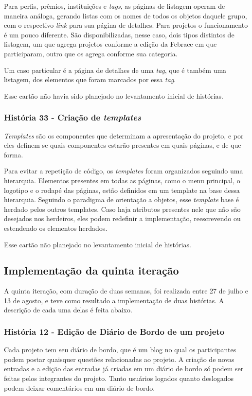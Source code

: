       Para perfis, prêmios, instituições e \textit{tags}, as páginas de listagem operam de maneira análoga, gerando listas com os nomes de todos os objetos daquele grupo, com o respectivo \textit{link} para sua página de detalhes. Para projetos o funcionamento é um pouco diferente. São disponibilizadas, nesse caso, dois tipos distintos de listagem, um que agrega projetos conforme a edição da Febrace em que participaram, outro que os agrega conforme sua categoria.

      Um caso particular é a página de detalhes de uma \textit{tag}, que é também uma listagem, dos elementos que foram marcados por essa \textit{tag}.

  Esse cartão não havia sido planejado no levantamento inicial de histórias.

    \subsubsection{História 33 - Criação de \textit{templates}}
      \textit{Templates} são os componentes que determinam a apresentação do projeto, e por eles definem-se quais componentes estarão presentes em quais páginas, e de que forma.

      Para evitar a repetição de código, os \textit{templates} foram organizados seguindo uma hierarquia. Elementos presentes em todas as páginas, como o menu principal, o logotipo e o rodapé das páginas, estão definidos em um template na base dessa hierarquia. Seguindo o paradigma de orientação a objetos, esse \textit{template} base é herdado pelos outros templates. Caso haja atributos presentes nele que não são desejados nos herdeiros, eles podem redefinir a implementação, reescrevendo ou estendendo os elementos herdados.

  Esse cartão não planejado no levantamento inicial de histórias.

 \subsection{Implementação da quinta iteração}
    A quinta iteração, com duração de duas semanas, foi realizada entre 27 de julho e 13 de agosto, e teve como resultado a implementação de duas histórias. A descrição de cada uma delas é feita abaixo.

    \subsubsection{História 12 - Edição de Diário de Bordo de um projeto}
      Cada projeto tem seu diário de bordo, que é um blog no qual os participantes podem postar quaisquer questões relacionadas ao projeto. A criação de novas entradas e a edição das entradas já criadas em um diário de bordo só podem ser feitas pelos integrantes do projeto. Tanto usuários logados quanto deslogados podem deixar comentários em um diário de bordo.

